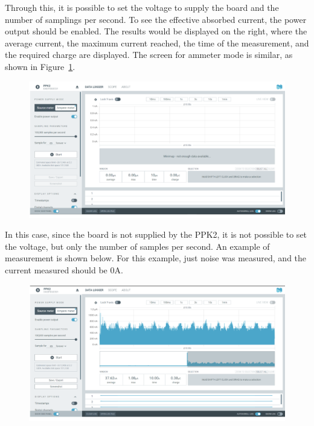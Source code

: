 \documentclass{Configuration_Files/PoliMi3i_thesis}
\begin{document}
Through this, it is possible to set the voltage to supply the board and the number of samplings per second. To see the effective absorbed current, the power output should be enabled. The results would be displayed on the right, where the average current, the maximum current reached, the time of the measurement, and the required charge are displayed. The screen for ammeter mode is similar, as shown in Figure~\ref{fig:power_profiler_app_amperemeter_mode}.

\begin{figure}[h]
    \centering
    \includegraphics[scale=0.3]{Test_Procedure/13.png}
    \label{fig:power_profiler_app_amperemeter_mode}
\end{figure}

In this case, since the board is not supplied by the PPK2, it is not possible to set the voltage, but only the number of samples per second. An example of measurement is shown below. For this example, just noise was measured, and the current measured should be 0A.

\begin{figure}[h]
    \centering
    \includegraphics[scale=0.3]{Test_Procedure/14.png}
    \label{fig:example_measurement_ppk2}
\end{figure}
\end{document}
